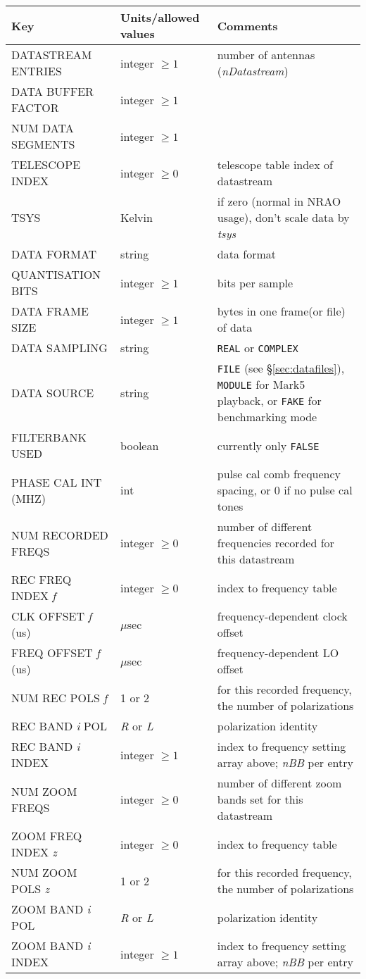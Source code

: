 \begin{center}
\begin{tabular}{l l l}
\hline
Key & Units/allowed values & Comments \\
\hline
DATASTREAM ENTRIES & integer $\ge 1$ & number of antennas ({\em nDatastream}) \\
DATA BUFFER FACTOR & integer $\ge 1$ &  \\
NUM DATA SEGMENTS  & integer $\ge 1$ &  \\
\hline
TELESCOPE INDEX & integer $\ge 0$ & telescope table index of datastream \\
TSYS & Kelvin & if zero (normal in NRAO usage), don't scale data by {\em tsys} \\
DATA FORMAT & string & data format \\
QUANTISATION BITS & integer $\ge 1$ & bits per sample \\
DATA FRAME SIZE & integer $\ge 1$ & bytes in one frame(or file) of data \\
DATA SAMPLING & string & {\tt REAL} or {\tt COMPLEX} \\
DATA SOURCE & string & {\tt FILE} (see \S\ref{sec:datafiles}), {\tt MODULE} for Mark5 playback, or {\tt FAKE} for benchmarking mode \\
FILTERBANK USED & boolean & currently only {\tt FALSE} \\
PHASE CAL INT (MHZ) & int & pulse cal comb frequency spacing, or 0 if no pulse cal tones \\
NUM RECORDED FREQS & integer $\ge 0$ & number of different frequencies recorded for this datastream \\
\hline
REC FREQ INDEX {\em f} & integer $\ge 0$ & index to frequency table \\
CLK OFFSET {\em f} (us) & $\mu$sec & frequency-dependent clock offset \\
FREQ OFFSET {\em f} (us) & $\mu$sec & frequency-dependent LO offset \\
NUM REC POLS {\em f} & 1 or 2 & for this recorded frequency, the number of polarizations \\
\hline
REC BAND {\em i} POL & {\em R} or {\em L} & polarization identity \\
REC BAND {\em i} INDEX & integer $\ge 1$ & index to frequency setting array above; {\em nBB} per entry \\
\hline
NUM ZOOM FREQS & integer $\ge 0$ & number of different zoom bands set for this datastream \\
\hline
ZOOM FREQ INDEX {\em z} & integer $\ge 0$ & index to frequency table \\
NUM ZOOM POLS {\em z} & 1 or 2 & for this recorded frequency, the number of polarizations \\
\hline
ZOOM BAND {\em i} POL & {\em R} or {\em L} & polarization identity \\
ZOOM BAND {\em i} INDEX & integer $\ge 1$ & index to frequency setting array above; {\em nBB} per entry \\
\end{tabular}
\end{center}

